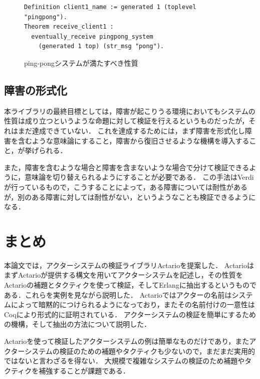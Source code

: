 \begin{figure}[tp]
\begin{lstlisting}
Definition client1_name := generated 1 (toplevel "pingpong").
Theorem receive_client1 :
  eventually_receive pingpong_system
    (generated 1 top) (str_msg "pong").
\end{lstlisting}
  \caption{ping-pongシステムが満たすべき性質}\label{code:conclusion:pingpong-spec}
\end{figure}

\subsection{障害の形式化}
本ライブラリの最終目標としては，障害が起こりうる環境においてもシステムの性質は成り立つというような命題に対して検証を行えるというものだったが，それはまだ達成できていない．
これを達成するためには，まず障害を形式化し障害を含むような意味論にすること，障害から復旧させるような機構を導入すること，が挙げられる．



また，障害を含むような場合と障害を含まないような場合で分けて検証できるように，意味論を切り替えられるようにすることが必要である．
この手法はVerdiが行っているもので，こうすることによって，ある障害については耐性があるが，別のある障害に対しては耐性がない，というようなことも検証できるようになる．


\section{まとめ}

本論文では，アクターシステムの検証ライブラリActarioを提案した．
ActarioはまずActarioが提供する構文を用いてアクターシステムを記述し，その性質をActarioの補題とタクティクを使って検証，そしてErlangに抽出するというものである．これらを実例を見ながら説明した．
Actarioではアクターの名前はシステムによって暗黙的につけられるようになっており，またその名前付けの一意性はCoqにより形式的に証明されている．
アクターシステムの検証を簡単にするための機構，そして抽出の方法について説明した．

Actarioを使って検証したアクターシステムの例は簡単なものだけであり，またアクターシステムの検証のための補題やタクティクも少ないので，まだまだ実用的ではないと言わざるを得ない．
大規模で複雑なシステムの検証のため補題やタクティクを補強することが課題である．
